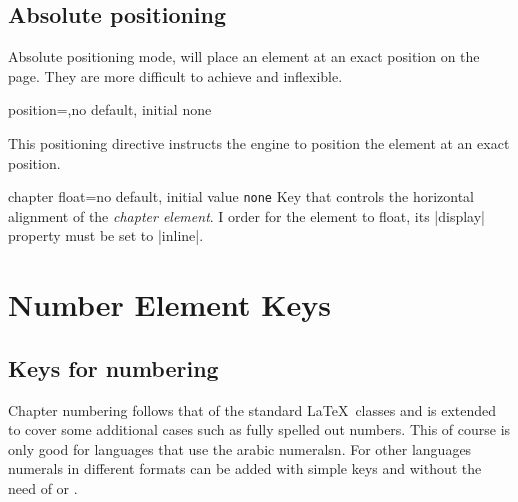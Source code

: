 \begin{figure}[htbp]
\makeatletter
\parindent0pt
\par
\vspace*{2cm}
\makeatother
\end{figure}

\subsection{Absolute positioning}

Absolute positioning mode, will place an element at an exact position on the page. They are more difficult to
achieve and inflexible. 

\begin{docKey}{position}{=,}{no default, initial none}{}

\end{docKey}



This positioning directive instructs the engine to position the element at an exact position.


\begin{docKey}[]{chapter float}{=}{no default, initial value \texttt{none}}
Key that controls the horizontal alignment of the \emph{chapter element}. I order for the
element to float, its |display| property must be set to |inline|.
\end{docKey}
\egroup


\section{Number Element Keys}


\subsection{Keys for numbering}

Chapter numbering follows that of the standard \LaTeX\ classes and is extended to cover some additional cases such as fully spelled out numbers. This of course is only good for languages that use the arabic numeralsn. For other languages numerals in different formats can be added with simple keys and without the need of  or . 

